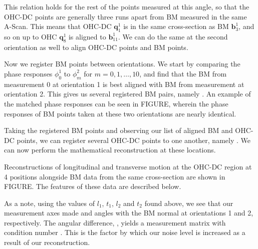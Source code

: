 \documentclass[preprint,NumberedRefs]{JASA}
\begin{document}
\par{This relation holds for the rest of the points measured at this angle, so that the OHC-DC points are generally three runs apart from BM measured in the same A-Scan. This means that OHC-DC $\mathbf{q}^1_1$ is in the same cross-section as BM $\mathbf{b}^1_3$, and so on up to OHC $\mathbf{q}^1_8$ is aligned to $\mathbf{b}^1_{11}$. We can do the same at the second orientation as well to align OHC-DC points and BM points.}
\par{Now we register BM points between orientations. We start by comparing the phase responses $\phi^1_0$ to $\phi^2_m$ for $m=0,1,\ldots,10$, and find that the BM from measurement 0 at orientation 1 is best aligned with BM from measurement   at orientation 2. This gives us several registered BM pairs, namely . An example of the matched phase responses can be seen in FIGURE, wherein the phase responses of BM points taken at these two orientations are nearly identical.}
\par{Taking the registered BM points and observing our list of aligned BM and OHC-DC points, we can register several OHC-DC points to one another, namely . We can now perform the mathematical reconstruction at these locations.}
\par{Reconstructions of longitudinal and transverse motion at the OHC-DC region at 4 positions alongside BM data from the same cross-section are shown in FIGURE. The features of these data are described below.}
\par{As a note, using the values of $l_1$, $t_1$, $l_2$ and $t_2$ found above, we see that our measurement axes made  and  angles with the BM normal at orientations 1 and 2, respectively. The angular difference,   , yields a measurement matrix with condition number  . This is the factor by which our noise level is increased as a result of our reconstruction.}
\end{document}
